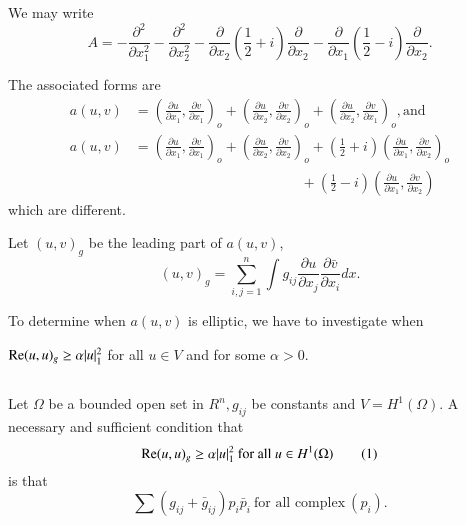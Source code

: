 We may write
$$
A=- \frac{\partial^2}{\partial x^2_1} - \frac{\partial^2}{\partial
  x^2_2}- \frac{\partial}{\partial x_2} \left(\frac{1}{2} + i\right)
\frac{\partial}{\partial x_2} - \frac{\partial}{\partial x_1}
\left(\frac{1}{2} - i\right) \frac{\partial}{\partial x_2}.  
$$

The associated forms are
\begin{align*}
  a(u,v) & = \left(\frac{\partial u}{\partial x_1}, \frac{\partial
    v}{\partial x_1}\right)_o + \left(\frac{\partial u}{\partial x_2},
  \frac{\partial v}{\partial x_2}\right)_o + \left(\frac{\partial
    u}{\partial x_2}, \frac{\partial v}{\partial x_1}\right)_o, \text{and}\\ 
  a(u,v) & = \left(\frac{\partial u}{\partial x_1} , \frac{\partial
    v}{\partial x_1}\right)_o + \left(\frac{\partial u}{\partial x_2},
  \frac{\partial v}{\partial x_2}\right)_o + \left(\frac{1}{2} +
  i\right) \left(\frac{\partial 
    u}{\partial x_1}, \frac{\partial v}{\partial x_2}\right)_o\\ 
  & \hspace{5cm}+
  \left(\frac{1}{2} -i\right) \left(\frac{\partial u}{\partial x_1} ,
  \frac{\partial v}{\partial x_2}\right) 
\end{align*}
which are different.

Let $(u, v)_g$ be the leading part of $a(u,v)$,
$$
(u, v)_g = \sum_{i, j=1}^{n} \int g_{ij} \frac{\partial u}{\partial
  x_j} \frac{\partial \bar{v}}{\partial x_i} dx. 
$$

To determine when $a(u, v)$ is elliptic, we have to investigate when

$\operatorname{Re}  (u,u)_g \geq \alpha |u|^2_1$ for all $u \in V$ and for
some $\alpha > 0$. 

\subsection{}\label{lec10:sec6:subsec2}

\begin{theorem}\label{lec10:sec6:subsec2:thm6.1}%
  Let $\Omega$ be a bounded open set in $R^n, g_{ij}$ be constants and
  $V = H^1 (\Omega)$. A necessary and sufficient condition that 
  \begin{equation}
    \operatorname{Re}  (u,u)_g \geq \alpha |u|^2_1 \text{ for all } u \in H^1
    (\Omega) \tag{1}\label{lec10:sec6:subsec2:eq1} 
  \end{equation} 
 is that 
\begin{equation*}
  \sum (g_{ij} + \bar{g}_{ij})p_i \bar{p}_i~ \text{for all complex}~
  (p_i).\tag{2}\label{lec10:sec6:subsec2:eq2}
\end{equation*}
\end{theorem}

